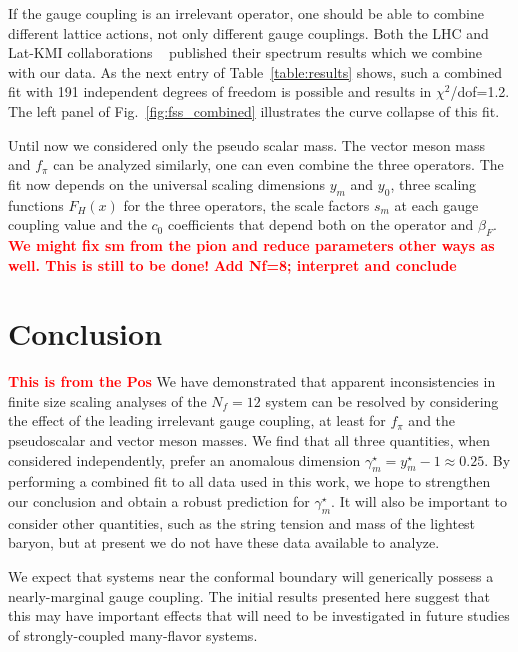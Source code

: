 \documentclass[aps,prl,twocolumn,]{revtex4}  %
\newcommand{\fig}[1]{Fig.~\ref{#1}}
\newcommand{\TODO}[1]{\textcolor{red}{{\bf #1}}}
\begin{document}
If the gauge coupling is an irrelevant operator, one should be able to combine different lattice actions, not only different gauge couplings. Both the LHC and Lat-KMI collaborations ~\protect\cite{Fodor:2011tu,Aoki:2012eq} published their spectrum results which we combine with our data. As the  next entry of Table~\ref{table:results} shows, such a combined fit with 191 independent degrees of freedom is possible and results in $\chi^2$/dof=1.2.  The left panel of \fig{fig:fss_combined} illustrates the curve collapse of this fit. 

Until now we considered only the pseudo scalar mass. The vector meson mass and $f_\pi$ can be analyzed similarly, one can even combine the three operators. The fit now depends on the universal scaling dimensions  $y_m$ and $y_0$, three scaling functions $F_H(x)$ for the three operators, the scale factors $s_m$ at each gauge coupling value and the $c_0$ coefficients that depend both on the operator and $\beta_F$. 
\TODO{ We might fix sm from the pion and reduce parameters other ways as well. This is still to be done!} 
\TODO{Add Nf=8; interpret and conclude} 


\section{Conclusion}
\TODO{This is from the Pos} We have demonstrated that apparent inconsistencies in finite size scaling analyses of the $N_f=12$ system can be resolved by considering the effect of the leading irrelevant gauge coupling, at least for $f_\pi$ and the pseudoscalar and vector meson masses.
We find that all three quantities, when considered independently, prefer an anomalous dimension $\gamma_m^{\star} = y_m^{\star} - 1 \approx 0.25$.
By performing a combined fit to all data used in this work, we hope to strengthen our conclusion and obtain a robust prediction for $\gamma_m^{\star}$.
It will also be important to consider other quantities, such as the string tension and mass of the lightest baryon, but at present we do not have these data available to analyze.

We expect that systems near the conformal boundary will generically possess a nearly-marginal gauge coupling.
The initial results presented here suggest that this may have important effects that will need to be investigated in future studies of strongly-coupled many-flavor systems.
\end{document}
